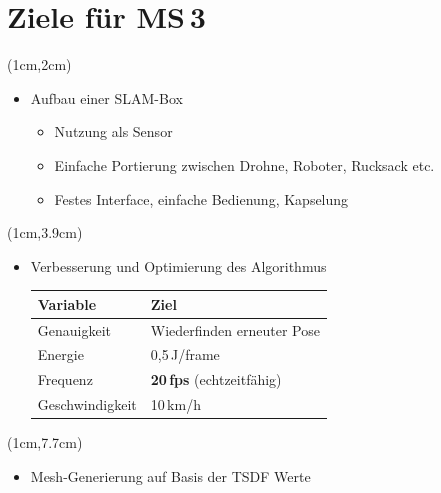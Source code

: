 \documentclass{beamer}
\begin{document}
\section{Ziele für MS\,3}
\begin{frame}{\secname}
\begin{textblock*}{12cm}(1cm,2cm)
\begin{itemize}
\item{Aufbau einer SLAM-Box}
\begin{itemize}
\item{Nutzung als Sensor}
\item{Einfache Portierung zwischen Drohne, Roboter, Rucksack etc.}
\item{Festes Interface, einfache Bedienung, Kapselung}
\end{itemize}
\end{itemize}
\end{textblock*}
\begin{textblock*}{12cm}(1cm,3.9cm)
\begin{itemize}
\item{Verbesserung und Optimierung des Algorithmus \\
\vspace{0.2cm}
\begin{tabular}{ll}
\toprule
Variable & Ziel \\
\midrule
Genauigkeit & Wiederfinden erneuter Pose \\
Energie & 0,5\,J/frame \\
Frequenz & \textbf{\color{dark}20\,fps} (echtzeitfähig) \\
Geschwindigkeit & 10\,km/h \\
\bottomrule
\end{tabular}}
\end{itemize}
\end{textblock*}
\begin{textblock*}{12cm}(1cm,7.7cm)
\begin{itemize}
\item{Mesh-Generierung auf Basis der TSDF Werte}
\end{itemize}
\end{textblock*}
\end{frame}
\end{document}
